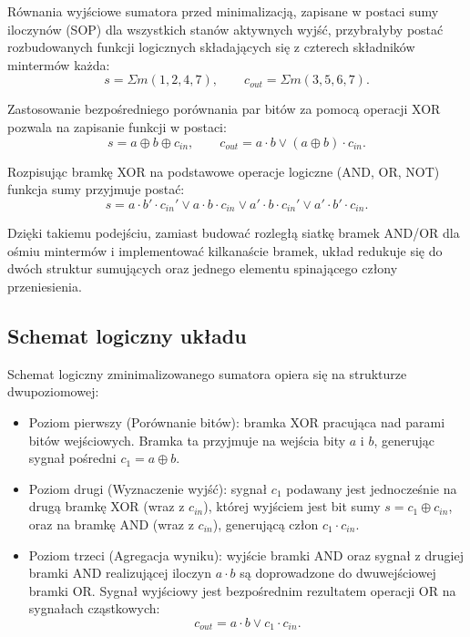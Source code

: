 Równania wyjściowe sumatora przed minimalizacją, zapisane w postaci sumy iloczynów (SOP) dla wszystkich stanów aktywnych wyjść, przybrałyby postać rozbudowanych funkcji logicznych składających się z czterech składników mintermów każda:
\begin{equation*}
s = \Sigma m(1, 2, 4, 7), \qquad c_{out} = \Sigma m(3, 5, 6, 7).
\end{equation*}

Zastosowanie bezpośredniego porównania par bitów za pomocą operacji XOR pozwala na zapisanie funkcji w postaci:
\begin{equation*}
s = a \oplus b \oplus c_{in}, \qquad c_{out} = a \cdot b \vee (a \oplus b) \cdot c_{in}.
\end{equation*}

Rozpisując bramkę XOR na podstawowe operacje logiczne (AND, OR, NOT) funkcja sumy przyjmuje postać:
\begin{equation*}
s = a \cdot b' \cdot c_{in}' \vee a \cdot b \cdot c_{in} \vee a' \cdot b \cdot c_{in}' \vee a' \cdot b' \cdot c_{in}.
\end{equation*}

Dzięki takiemu podejściu, zamiast budować rozległą siatkę bramek AND/OR dla ośmiu mintermów i implementować kilkanaście bramek, układ redukuje się do dwóch struktur sumujących oraz jednego elementu spinającego człony przeniesienia.

\subsection{Schemat logiczny układu}

Schemat logiczny zminimalizowanego sumatora opiera się na strukturze dwupoziomowej:

\begin{itemize}
    \item Poziom pierwszy (Porównanie bitów): bramka XOR pracująca nad parami bitów wejściowych. Bramka ta przyjmuje na wejścia bity $a$ i $b$, generując sygnał pośredni $c_1 = a \oplus b$.
    \item Poziom drugi (Wyznaczenie wyjść): sygnał $c_1$ podawany jest jednocześnie na drugą bramkę XOR (wraz z $c_{in}$), której wyjściem jest bit sumy $s = c_1 \oplus c_{in}$, oraz na bramkę AND (wraz z $c_{in}$), generującą człon $c_1 \cdot c_{in}$.
    \item Poziom trzeci (Agregacja wyniku): wyjście bramki AND oraz sygnał z drugiej bramki AND realizującej iloczyn $a \cdot b$ są doprowadzone do dwuwejściowej bramki OR. Sygnał wyjściowy jest bezpośrednim rezultatem operacji OR na sygnałach cząstkowych:
    \begin{equation*}
    c_{out} = a \cdot b \vee c_1 \cdot c_{in}.
    \end{equation*}
\end{itemize}

